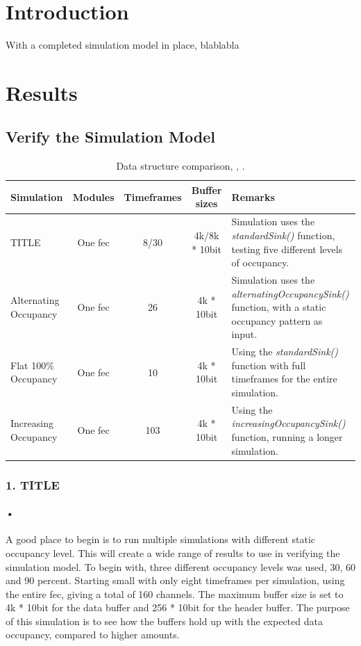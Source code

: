 \documentclass[a4paper, 12pt]{report}
\begin{document}
\section{Introduction}
With a completed simulation model in place, blablabla

\section{Results}

\subsection{Verify the Simulation Model}
\begin{table}
	\begin{tabular}{| p{2cm} | c | c | c | p{4cm} |}
		\hline
		\textbf{Simulation} & \textbf{Modules} & \textbf{Timeframes} & \textbf{Buffer sizes} & \textbf{Remarks} \\
		\hline
		TITLE & One \gls{fec} & 8/30 & 4k/8k * 10bit & Simulation uses the \textit{standardSink()} function, testing five different levels of occupancy. \\
		\hline
		Alternating Occupancy & One \gls{fec} & 26 & 4k * 10bit & Simulation uses the \textit{alternatingOccupancySink()} function, with a static occupancy pattern as input. \\
		\hline
		Flat 100\% Occupancy & One \gls{fec} & 10 & 4k * 10bit & Using the \textit{standardSink()} function with full timeframes for the entire simulation. \\
		\hline
		Increasing Occupancy & One \gls{fec} & 103 & 4k * 10bit & Using the \textit{increasingOccupancySink()} function, running a longer simulation. \\
		\hline
	\end{tabular}
	\caption[]{Data structure comparison\cite{vector}, \cite{list}, \cite{queue}.}
	\label{tab:setup-1}
\end{table}

\subsubsection{1. TITLE}

\paragraph{•}
A good place to begin is to run multiple simulations with different static occupancy level.
This will create a wide range of results to use in verifying the simulation model.
To begin with, three different occupancy levels was used, 30, 60 and 90 percent.
Starting small with only eight timeframes per simulation, using the entire \gls{fec}, giving a total of 160 channels.
The maximum buffer size is set to 4k * 10bit for the data buffer and 256 * 10bit for the header buffer.
The purpose of this simulation is to see how the buffers hold up with the expected data occupancy, compared to higher amounts.
\end{document}
